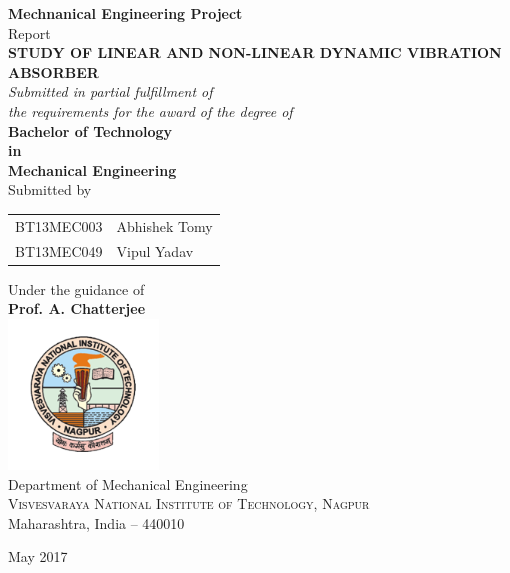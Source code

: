 %
%
%
\begin{titlepage}
\boxit
\begin{center}
\textup{ {\bf Mechnanical Engineering Project} \\ Report}\\
\huge \textbf {\color{red}\uppercase{STUDY OF Linear and Non-linear Dynamic Vibration Absorber}}\\
       \small \emph{Submitted in partial fulfillment of\\
       the requirements for the award of the degree of}\\[0.1in]

	{\bf \color{blue} Bachelor of Technology \\in\\ Mechanical Engineering}\\[0.2in]

\normalsize Submitted by \\
\begin{table}[h]
\centering
\begin{tabular}{ll} 
BT13MEC003 & Abhishek Tomy\\
BT13MEC049 & Vipul Yadav
 
\end{tabular}
\end{table}

Under the guidance of\\
{\textbf{Prof. A. Chatterjee}}\\[0.2in]

\includegraphics[width=0.3\textwidth]{"figures/vnitLogo"}\\[0.1in]
\Large{Department of Mechanical Engineering}\\
\normalsize
\textsc{Visvesvaraya National Institute of Technology, Nagpur}\\
Maharashtra, India -- 440010 \\
\end{center}
\begin{center}
\large May 2017
\end{center}

\end{titlepage}


